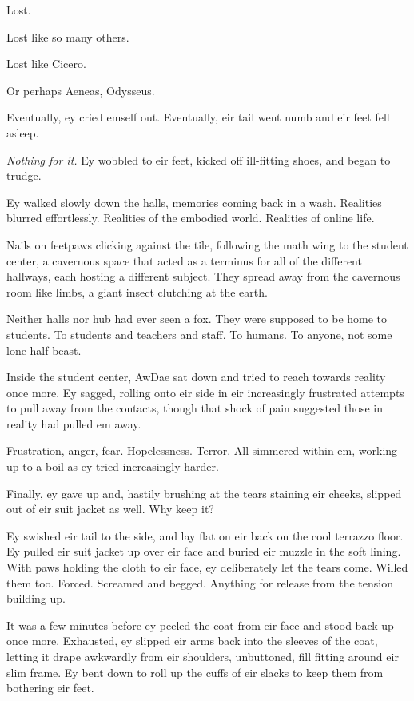 Lost.

Lost like so many others.

Lost like Cicero.

Or perhaps Aeneas, Odysseus.

Eventually, ey cried emself out. Eventually, eir tail went numb and eir feet fell asleep.

\emph{Nothing for it.} Ey wobbled to eir feet, kicked off ill-fitting shoes, and began to trudge.

Ey walked slowly down the halls, memories coming back in a wash. Realities blurred effortlessly. Realities of the embodied world. Realities of online life.

Nails on feetpaws clicking against the tile, following the math wing to the student center, a cavernous space that acted as a terminus for all of the different hallways, each hosting a different subject. They spread away from the cavernous room like limbs, a giant insect clutching at the earth.

Neither halls nor hub had ever seen a fox. They were supposed to be home to students. To students and teachers and staff. To humans. To anyone, not some lone half-beast.

Inside the student center, AwDae sat down and tried to reach towards reality once more. Ey sagged, rolling onto eir side in eir increasingly frustrated attempts to pull away from the contacts, though that shock of pain suggested those in reality had pulled em away.

Frustration, anger, fear. Hopelessness. Terror. All simmered within em, working up to a boil as ey tried increasingly harder.

Finally, ey gave up and, hastily brushing at the tears staining eir cheeks, slipped out of eir suit jacket as well. Why keep it?

Ey swished eir tail to the side, and lay flat on eir back on the cool terrazzo floor. Ey pulled eir suit jacket up over eir face and buried eir muzzle in the soft lining. With paws holding the cloth to eir face, ey deliberately let the tears come. Willed them too. Forced. Screamed and begged. Anything for release from the tension building up.

It was a few minutes before ey peeled the coat from eir face and stood back up once more. Exhausted, ey slipped eir arms back into the sleeves of the coat, letting it drape awkwardly from eir shoulders, unbuttoned, fill fitting around eir slim frame. Ey bent down to roll up the cuffs of eir slacks to keep them from bothering eir feet.

